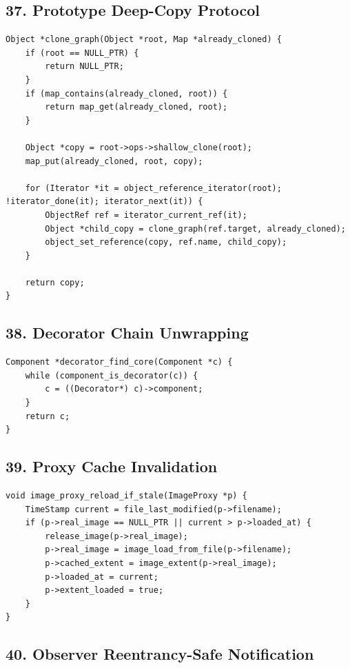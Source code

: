 \documentclass[11pt]{article}
\begin{document}
\subsection{37. Prototype Deep-Copy Protocol}\label{prototype-deep-copy-protocol}

\begin{verbatim}
Object *clone_graph(Object *root, Map *already_cloned) {
    if (root == NULL_PTR) {
        return NULL_PTR;
    }
    if (map_contains(already_cloned, root)) {
        return map_get(already_cloned, root);
    }

    Object *copy = root->ops->shallow_clone(root);
    map_put(already_cloned, root, copy);

    for (Iterator *it = object_reference_iterator(root); !iterator_done(it); iterator_next(it)) {
        ObjectRef ref = iterator_current_ref(it);
        Object *child_copy = clone_graph(ref.target, already_cloned);
        object_set_reference(copy, ref.name, child_copy);
    }

    return copy;
}
\end{verbatim}

\subsection{38. Decorator Chain Unwrapping}\label{decorator-chain-unwrapping}

\begin{verbatim}
Component *decorator_find_core(Component *c) {
    while (component_is_decorator(c)) {
        c = ((Decorator*) c)->component;
    }
    return c;
}
\end{verbatim}

\subsection{39. Proxy Cache Invalidation}\label{proxy-cache-invalidation}

\begin{verbatim}
void image_proxy_reload_if_stale(ImageProxy *p) {
    TimeStamp current = file_last_modified(p->filename);
    if (p->real_image == NULL_PTR || current > p->loaded_at) {
        release_image(p->real_image);
        p->real_image = image_load_from_file(p->filename);
        p->cached_extent = image_extent(p->real_image);
        p->loaded_at = current;
        p->extent_loaded = true;
    }
}
\end{verbatim}

\subsection{40. Observer Reentrancy-Safe Notification}\label{observer-reentrancy-safe-notification}
\end{document}
